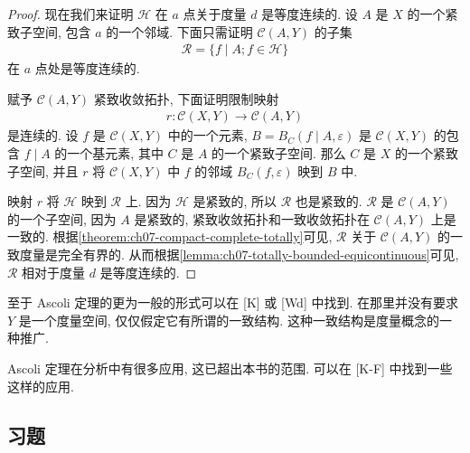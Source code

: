\documentclass[../../main.tex]{subfiles}
\begin{document}
\begin{proof}
现在我们来证明 $\mathcal{H}$ 在 $a$ 点关于度量 $d$ 是等度连续的. 设 $A$ 是 $X$ 的一个紧致子空间, 包含 $a$ 的一个邻域. 下面只需证明 $\mathcal{C}(A,Y)$ 的子集
\begin{align*}
\mathcal{R}=\{f\mid A;f\in\mathcal{H}\}
\end{align*}
在 $a$ 点处是等度连续的.

赋予 $\mathcal{C}(A,Y)$ 紧致收敛拓扑, 下面证明限制映射
\begin{align*}
r\colon\mathcal{C}(X,Y)\longrightarrow\mathcal{C}(A,Y)
\end{align*}
是连续的. 设 $f$ 是 $\mathcal{C}(X,Y)$ 中的一个元素, $B=B_C(f\mid A,\varepsilon)$ 是 $\mathcal{C}(X,Y)$ 的包含 $f\mid A$ 的一个基元素, 其中 $C$ 是 $A$ 的一个紧致子空间. 那么 $C$ 是 $X$ 的一个紧致子空间, 并且 $r$ 将 $\mathcal{C}(X,Y)$ 中 $f$ 的邻域 $B_C(f,\varepsilon)$ 映到 $B$ 中.

映射 $r$ 将 $\mathcal{H}$ 映到 $\mathcal{R}$ 上. 因为 $\mathcal{H}$ 是紧致的, 所以 $\mathcal{R}$ 也是紧致的. $\mathcal{R}$ 是 $\mathcal{C}(A,Y)$ 的一个子空间, 因为 $A$ 是紧致的, 紧致收敛拓扑和一致收敛拓扑在 $\mathcal{C}(A,Y)$ 上是一致的. 根据\cref{theorem:ch07-compact-complete-totally}可见, $\mathcal{R}$ 关于 $\mathcal{C}(A,Y)$ 的一致度量是完全有界的. 从而根据\cref{lemma:ch07-totally-bounded-equicontinuous}可见, $\mathcal{R}$ 相对于度量 $d$ 是等度连续的.
\end{proof}

至于 Ascoli 定理的更为一般的形式可以在 [K] 或 [Wd] 中找到. 在那里并没有要求 $Y$ 是一个度量空间, 仅仅假定它有所谓的一致结构. 这种一致结构是度量概念的一种推广.

Ascoli 定理在分析中有很多应用, 这已超出本书的范围. 可以在 [K-F] 中找到一些这样的应用.

\subsection*{习题}
\end{document}
